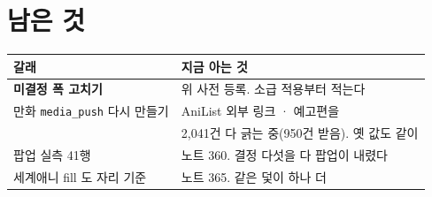 \documentclass[11pt]{article}
\begin{document}
\section{남은 것}

\begin{center}
\begin{tabular}{ll}
\hline
갈래 & 지금 아는 것 \\
\hline
\textbf{미결정 폭 고치기} & 위 사전 등록. 소급 적용부터 적는다 \\
만화 \texttt{media\_push} 다시 만들기 & AniList 외부 링크 · 예고편을 \\
 & 2,041건 다 긁는 중(950건 받음). 옛 값도 같이 \\
팝업 실측 41행 & 노트 360. 결정 다섯을 다 팝업이 내렸다 \\
세계애니 fill 도 자리 기준 & 노트 365. 같은 덫이 하나 더 \\
\hline
\end{tabular}
\end{center}
\end{document}
